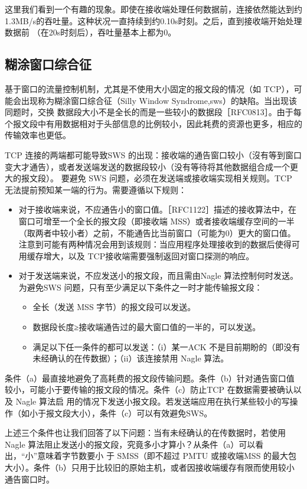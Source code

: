 这里我们看到一个有趣的现象。即使在接收端处理任何数据前，连接依然能达到约1.3MB/s的吞吐量。这种状况一直持续到约0.10s时刻。之后，直到接收端开始处理数据前
（在20s时刻后），吞吐量基本上都为0。

\subsection{糊涂窗口综合征}
基于窗口的流量控制机制，尤其是不使用大小固定的报文段的情况（如 TCP），可能会出现称为糊涂窗口综合征（Silly Window Syndrome,sws）的缺陷。当出现该同题时，交换
数据段大小不是全长的而是一些较小的数据段［RFC0813］。由于每个报文段中有用数据相对于头部信息的比例较小，因此耗费的资源也更多，相应的传输效率也更低。

TCP 连接的两端都可能导致SWS 的出现：接收端的通告窗口较小（沒有等到窗口变大才通告），或者发送端发送的数据段较小（没有等待将其他数据组合成一个更大的报文段）。
要避免 SWS 问题，必须在发送端或接收端实现相关规则。TCP 无法提前预知某一端的行为。需要遵循以下规则：
\begin{itemize}
    \item 对于接收端来说，不应通告小的窗口值。［RFC1122］描述的接收算法中，在窗口可增至一个全长的报文段（即接收端 MSS）或者接收端缓存空间的一半（取两者中较小者）之前，不能通告比当前窗口（可能为0）更大的窗口值。注意到可能有两种情况会用到该规则：当应用程序处理接收到的数据后使得可用缓存增大，以及 TCP接收端需要强制返回对窗口探测的响应。
    \item 对于发送端来说，不应发送小的报文段，而且需由Nagle 算法控制何时发送。为避免SWS 问题，只有至少满足以下条件之一时才能传输报文段：
    \begin{itemize}
        \item 全长（发送 MSS 字节）的报文段可以发送。
        \item 数据段长度≥接收端通告过的最大窗口值的一半的，可以发送。
        \item 满足以下任一条件的都可以发送：（i）某一ACK 不是目前期盼的（即没有未经确认的在传数据）；（ii）该连接禁用 Nagle 算法。
    \end{itemize}
\end{itemize}

条件（a）最直接地避免了高耗费的报文段传输问题。条件（b）针对通告窗口值较小，可能小于要传输的报文段的情况。条件（c）防止TCP 在数据需要被确认以及 Nagle 算法启
用的情况下发送小报文段。若发送端应用在执行某些较小的写操作（如小于报文段大小），条件（c）可以有效避免SWS。

上述三个条件也让我们回答了以下问题：当有未经确认的在传数据时，若使用Nagle 算法阻止发送小的报文段，究竟多小才算小？从条件（a）可以看出，“小”意味着字节数要小
于 SMSS（即不超过 PMTU 或接收端MSS 的最大包大小）。条件（b）只用于比较旧的原始主机，或者因接收端缓存有限而使用较小通告窗口时。

